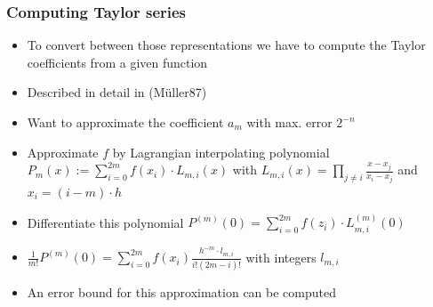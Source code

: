 \documentclass[xcolor=pdftex,dvipsnames,table]{beamer}
\begin{document}
\begin{frame}[<+->]
\frametitle{Computing Taylor series}
\begin{itemize}
\item To convert between those representations we have to compute the Taylor coefficients from a given function
\item Described in detail in (M\"uller87)
\item Want to approximate the coefficient $a_m$ with max. error $2^{-n}$
\item Approximate $f$ by Lagrangian interpolating polynomial $P_m(x) := \sum_{i=0}^{2m} f(x_i) \cdot L_{m,i}(x)$ with $L_{m,i}(x) = \prod_{j \neq i} \frac{x-x_j}{x_i-x_j} $ and $x_i = (i-m)\cdot h$
\item Differentiate this polynomial $P^{(m)}(0) = \sum_{i=0}^{2m} f(z_i)\cdot L_{m,i}^{(m)}(0)$
\item $\frac{1}{m!}P^{(m)}(0) = \sum_{i=0}^{2m} f(x_i)\frac{h^{-m}\cdot l_{m,i}}{i!(2m-i)!}$ with integers $l_{m,i}$
\item An error bound for this approximation can be computed
\end{itemize}
\end{frame}
\end{document}
